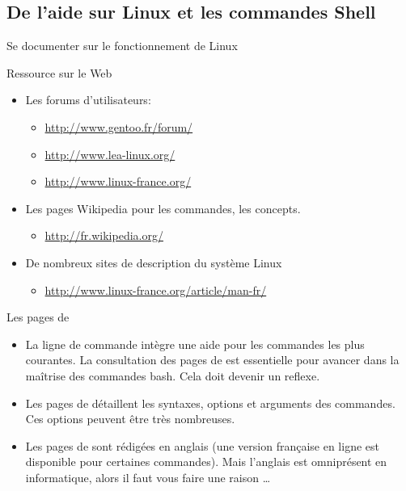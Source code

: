 \subsection{De l'aide sur Linux et les commandes Shell}
\begin{frame}{Se documenter sur le fonctionnement de Linux}
  \begin{block}{Ressource sur le Web}
    \begin{itemize}
    \item Les forums d'utilisateurs:
      \begin{itemize}
      \item \url{http://www.gentoo.fr/forum/}
      \item \url{http://www.lea-linux.org/}
      \item \url{http://www.linux-france.org/}
      \end{itemize}
    \item Les pages Wikipedia pour les commandes, les concepts.
      \begin{itemize}
      \item \url{http://fr.wikipedia.org/}
      \end{itemize}
    \item De nombreux sites de description du système Linux
      \begin{itemize}
      \item \url{http://www.linux-france.org/article/man-fr/}
      \end{itemize}
    \end{itemize}
  \end{block}
  \begin{block}{Les pages de }
    \begin{itemize}
    \item La ligne de commande intègre une aide pour les commandes les
      plus courantes. La consultation des pages de  est
      essentielle pour avancer dans la maîtrise des commandes bash. Cela
      doit devenir un reflexe.
    \item Les pages de  détaillent les syntaxes, options et
      arguments des commandes. Ces options peuvent être très nombreuses.
    \item Les pages de  sont rédigées en anglais (une version
      française en ligne est disponible pour certaines commandes). Mais
      l'anglais est omniprésent en informatique, alors il faut vous
      faire une raison \dots
    \end{itemize}
  \end{block}
\end{frame}

